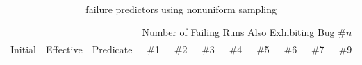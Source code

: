 
\begin{table*}
  \nocaptionrule
  \caption{\moss failure predictors using nonuniform sampling}
  \label{tab:mossdilute}
  \centering
  \scriptsize
  \begin{tabular}{lllrrrrrrrr}
    \toprule
    & & &
    \multicolumn{8}{c}{Number of Failing Runs Also Exhibiting Bug \#$n$} \\
    \cmidrule(lr){4-11}
    Initial &
    Effective &
    Predicate &
    \#1 & \#2 & \#3 & \#4 & \#5 & \#6 & \#7 & \#9 \\
    \midrule
    
    \bottomrule
  \end{tabular}
\end{table*}

